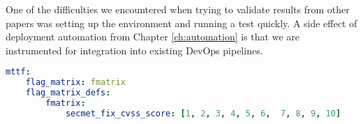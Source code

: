 
One of the difficulties we encountered when trying to validate results from other papers was setting up the environment and running a test quickly. A side effect of deployment automation from Chapter \ref{ch:automation} is that we are instrumented for integration into existing DevOps pipelines. 

 

\begin{minipage}{\linewidth}
\begin{lstlisting}[language=yaml, label={lst:smaas_fnatrix}, caption={Define Multiple Tests in a Single Line},captionpos=b, linewidth=1\textwidth]
mttf:
    flag_matrix: fmatrix
    flag_matrix_defs:
        fmatrix:
            secmet_fix_cvss_score: [1, 2, 3, 4, 5, 6,  7, 8, 9, 10]
       
\end{lstlisting}
\end{minipage}



